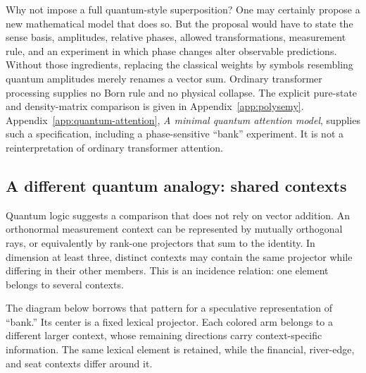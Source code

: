 \documentclass[
  aps,
  reprint,
  superscriptaddress,
  floatfix,
  nofootinbib,
  longbibliography
]{revtex4-2}
\begin{document}
Why not impose a full quantum-style superposition?  One may certainly propose
a new mathematical model that does so.  But the proposal would have to state
the sense basis, amplitudes, relative phases, allowed transformations,
measurement rule, and an experiment in which phase changes alter observable
predictions.  Without those ingredients, replacing the classical weights by
symbols resembling quantum amplitudes merely renames a vector sum.  Ordinary
transformer processing supplies no Born rule and no physical collapse.  The
explicit pure-state and density-matrix comparison is given in
Appendix~\ref{app:polysemy}.  Appendix~\ref{app:quantum-attention}, \emph{A
minimal quantum attention model}, supplies such a specification, including a
phase-sensitive ``bank'' experiment.  It is not a reinterpretation of
ordinary transformer attention.

\subsection{A different quantum analogy: shared contexts}

Quantum logic suggests a comparison that does not rely on vector addition.
An orthonormal measurement context can be represented by mutually orthogonal
rays, or equivalently by rank-one projectors that sum to the identity.  In
dimension at least three, distinct contexts may contain the same projector
while differing in their other members.  This is an incidence relation: one
element belongs to several contexts.

The diagram below borrows that pattern for a speculative representation of
``bank.''  Its center is a fixed lexical projector.  Each colored arm belongs
to a different larger context, whose remaining directions carry
context-specific information.  The same lexical element is retained, while
the financial, river-edge, and seat contexts differ around it.
\end{document}
